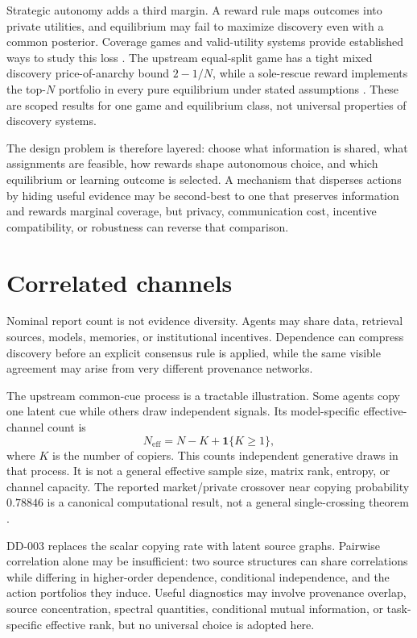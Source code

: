 \documentclass[11pt]{article}
\theoremstyle{remark}
\begin{document}
Strategic autonomy adds a third margin. A reward rule maps outcomes into private utilities, and equilibrium may fail to maximize discovery even with a common posterior. Coverage games and valid-utility systems provide established ways to study this loss \citep{Vetta2002,Gairing2009}. The upstream equal-split game has a tight mixed discovery price-of-anarchy bound $2-1/N$, while a sole-rescue reward implements the top-$N$ portfolio in every pure equilibrium under stated assumptions \citep{Nakajima2026SharedDiscovery}. These are scoped results for one game and equilibrium class, not universal properties of discovery systems.

The design problem is therefore layered: choose what information is shared, what assignments are feasible, how rewards shape autonomous choice, and which equilibrium or learning outcome is selected. A mechanism that disperses actions by hiding useful evidence may be second-best to one that preserves information and rewards marginal coverage, but privacy, communication cost, incentive compatibility, or robustness can reverse that comparison.

\section{Correlated channels}
Nominal report count is not evidence diversity. Agents may share data, retrieval sources, models, memories, or institutional incentives. Dependence can compress discovery before an explicit consensus rule is applied, while the same visible agreement may arise from very different provenance networks.

The upstream common-cue process is a tractable illustration. Some agents copy one latent cue while others draw independent signals. Its model-specific effective-channel count is
\[
N_{\mathrm{eff}}=N-K+\mathbf 1\{K\ge1\},
\]
where $K$ is the number of copiers. This counts independent generative draws in that process. It is not a general effective sample size, matrix rank, entropy, or channel capacity. The reported market/private crossover near copying probability $0.78846$ is a canonical computational result, not a general single-crossing theorem \citep{Nakajima2026SharedDiscovery}.

DD-003 replaces the scalar copying rate with latent source graphs. Pairwise correlation alone may be insufficient: two source structures can share correlations while differing in higher-order dependence, conditional independence, and the action portfolios they induce. Useful diagnostics may involve provenance overlap, source concentration, spectral quantities, conditional mutual information, or task-specific effective rank, but no universal choice is adopted here.
\end{document}
